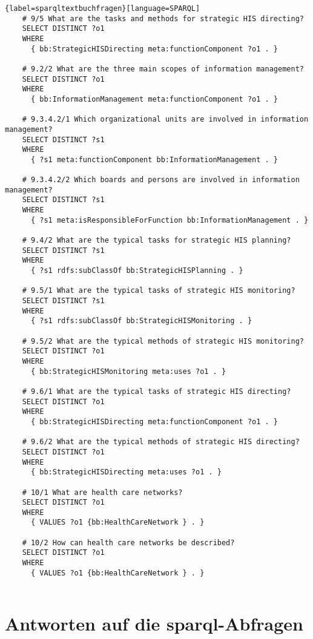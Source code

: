 \begin{lstlisting}{label=sparqltextbuchfragen}[language=SPARQL]
    # 9/5 What are the tasks and methods for strategic HIS directing?
    SELECT DISTINCT ?o1
    WHERE
      { bb:StrategicHISDirecting meta:functionComponent ?o1 . }
    
    # 9.2/2 What are the three main scopes of information management?
    SELECT DISTINCT ?o1
    WHERE
      { bb:InformationManagement meta:functionComponent ?o1 . }
    
    # 9.3.4.2/1 Which organizational units are involved in information management?
    SELECT DISTINCT ?s1
    WHERE
      { ?s1 meta:functionComponent bb:InformationManagement . }
    
    # 9.3.4.2/2 Which boards and persons are involved in information management?
    SELECT DISTINCT ?s1
    WHERE
      { ?s1 meta:isResponsibleForFunction bb:InformationManagement . }
    
    # 9.4/2 What are the typical tasks for strategic HIS planning?
    SELECT DISTINCT ?s1
    WHERE
      { ?s1 rdfs:subClassOf bb:StrategicHISPlanning . }
    
    # 9.5/1 What are the typical tasks of strategic HIS monitoring?
    SELECT DISTINCT ?s1
    WHERE
      { ?s1 rdfs:subClassOf bb:StrategicHISMonitoring . }
    
    # 9.5/2 What are the typical methods of strategic HIS monitoring?
    SELECT DISTINCT ?o1
    WHERE
      { bb:StrategicHISMonitoring meta:uses ?o1 . }
    
    # 9.6/1 What are the typical tasks of strategic HIS directing?
    SELECT DISTINCT ?o1
    WHERE
      { bb:StrategicHISDirecting meta:functionComponent ?o1 . }
    
    # 9.6/2 What are the typical methods of strategic HIS directing?
    SELECT DISTINCT ?o1
    WHERE
      { bb:StrategicHISDirecting meta:uses ?o1 . }
    
    # 10/1 What are health care networks?
    SELECT DISTINCT ?o1
    WHERE
      { VALUES ?o1 {bb:HealthCareNetwork } . }
    
    # 10/2 How can health care networks be described?
    SELECT DISTINCT ?o1
    WHERE
      { VALUES ?o1 {bb:HealthCareNetwork } . }
    
    \end{lstlisting}

\section[Antworten auf die SPARQL-Abfragen]{Antworten auf die \ac{sparql}-Abfragen}\label{sub:antwortentextbuch}

